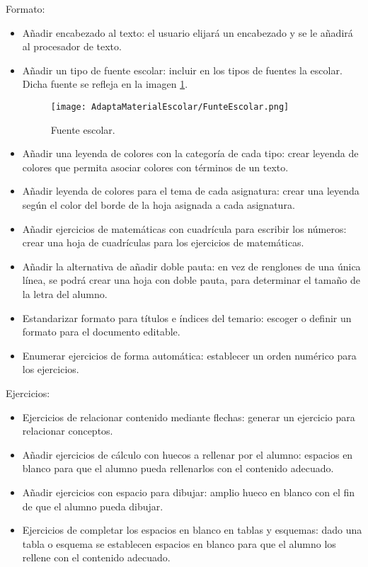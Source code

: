 Formato: 
\begin{itemize}
  \item Añadir encabezado al texto: el usuario elijará un encabezado y se le añadirá al procesador de texto.
  \item Añadir un tipo de fuente escolar: incluir en los tipos de fuentes la escolar. Dicha fuente se refleja en la imagen \ref{escolar}.
  \begin{figure}[ht!]
    \centering
    \texttt{[image: AdaptaMaterialEscolar/FunteEscolar.png]}
    \caption{Fuente escolar.}
    \label{escolar}
\end{figure}
  \item Añadir una leyenda de colores con la categoría de cada tipo: crear leyenda de colores que permita asociar colores con términos de un texto.
  \item Añadir leyenda de colores para el tema de cada asignatura: crear una leyenda según el color del borde de la hoja asignada a cada asignatura.
  \item Añadir ejercicios de matemáticas con cuadrícula para escribir los números: crear una hoja de cuadrículas para los ejercicios de matemáticas.
  \item Añadir la alternativa de añadir doble pauta: en vez de renglones de una única línea, se podrá crear una hoja con doble pauta, para determinar el tamaño de la letra del alumno.
  \item Estandarizar formato para títulos e índices del temario: escoger o definir un formato para el documento editable.
  \item Enumerar ejercicios de forma automática: establecer un orden numérico para los ejercicios.
\end{itemize}
Ejercicios:
\begin{itemize}
  \item Ejercicios de relacionar contenido mediante flechas: generar un ejercicio para relacionar conceptos.
  \item Añadir ejercicios de cálculo con huecos a rellenar por el alumno: espacios en blanco para que el alumno pueda rellenarlos con el contenido adecuado.
  \item Añadir ejercicios con espacio para dibujar: amplio hueco en blanco con el fin de que el alumno pueda dibujar.
  \item Ejercicios de completar los espacios en blanco en tablas y esquemas: dado una tabla o esquema se establecen espacios en blanco para que el alumno los rellene con el contenido adecuado.
\end{itemize}
